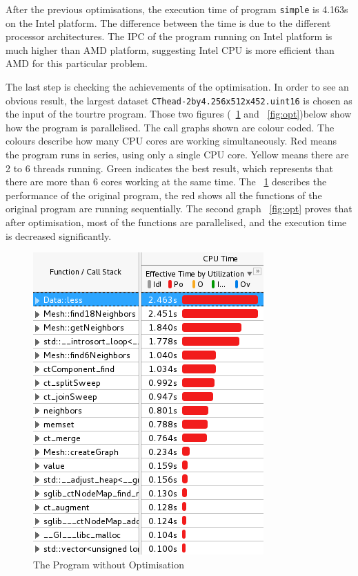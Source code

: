 \documentclass[conference]{IEEEtran}
\newcommand{\fref}[1]{\figurename~\ref{#1}}
\begin{document}
After the previous optimisations, the execution time of program \texttt{simple} is 4.163s on the Intel platform. The difference between the time is due to the different processor architectures. The IPC of the program running on Intel platform is much higher than AMD platform, suggesting Intel CPU is more efficient than AMD for this particular problem.

The last step is checking the achievements of the optimisation.
In order to see an obvious result, the largest dataset \texttt{CThead-2by4.256x512x452.uint16} is chosen as the input of the tourtre program.
Those two figures (\fref{fig:noopt} and \fref{fig:opt})below show how the program is parallelised.
The call graphs shown are colour coded. The colours describe how many CPU cores are working simultaneously.
Red means the program runs in series, using only a single CPU core. Yellow means there are 2 to 6 threads running. Green indicates the best result, which represents that there are more than 6 cores working at the same time.
The \fref{fig:noopt} describes the performance of the original program, the red shows all the functions of the original program are running sequentially. The second graph \fref{fig:opt} proves that after optimisation, most of the functions are parallelised, and the execution time is decreased significantly. 

\begin{figure}[!h]
    \centering
    \includegraphics[width=0.8\columnwidth]{noopt_vtune}
    \caption{The Program without Optimisation}
    \label{fig:noopt}
\end{figure}
\end{document}
